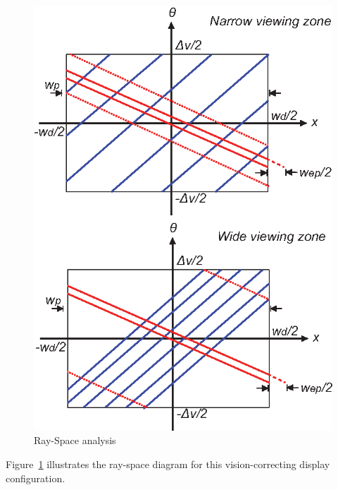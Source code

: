 \begin{figure}[t]
	\begin{center}
   		\includegraphics[width=0.95\linewidth]{images/RaySpace.eps}
	\end{center}
  	 \caption{Ray-Space analysis}
\label{fig:rayspace}
\end{figure}

Figure~\ref{fig:rayspace} illustrates the ray-space diagram for this vision-correcting display configuration.
